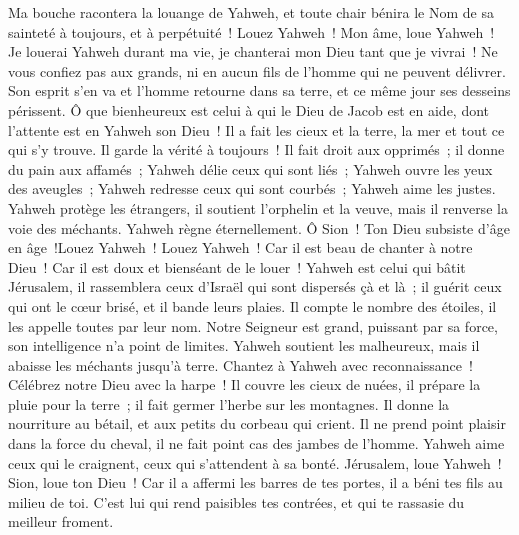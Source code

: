 \begin{multicols}{2}
 Ma bouche racontera la louange de Yahweh, et toute chair bénira le Nom de sa sainteté à toujours, et à perpétuité~!
\VerseOne{}Louez Yahweh~! Mon âme, loue Yahweh~!
Je louerai Yahweh durant ma vie, je chanterai mon Dieu tant que je vivrai~!
Ne vous confiez pas aux grands, ni en aucun fils de l'homme qui ne peuvent délivrer.
Son esprit s'en va et l'homme retourne dans sa terre, et ce même jour ses desseins périssent.
Ô que bienheureux est celui à qui le Dieu de Jacob est en aide, dont l'attente est en Yahweh son Dieu~!
Il a fait les cieux et la terre, la mer et tout ce qui s'y trouve. Il garde la vérité à toujours~!
Il fait droit aux opprimés~; il donne du pain aux affamés~; Yahweh délie ceux qui sont liés~;
Yahweh ouvre les yeux des aveugles~; Yahweh redresse ceux qui sont courbés~; Yahweh aime les justes.
Yahweh protège les étrangers, il soutient l'orphelin et la veuve, mais il renverse la voie des méchants.
Yahweh règne éternellement. Ô Sion~! Ton Dieu subsiste d'âge en âge~!Louez Yahweh~!
\VerseOne{}Louez Yahweh~! Car il est beau de chanter à notre Dieu~! Car il est doux et bienséant de le louer~!
Yahweh est celui qui bâtit Jérusalem, il rassemblera ceux d'Israël qui sont dispersés çà et là~;
il guérit ceux qui ont le cœur brisé, et il bande leurs plaies.
Il compte le nombre des étoiles, il les appelle toutes par leur nom.
Notre Seigneur est grand, puissant par sa force, son intelligence n'a point de limites.
Yahweh soutient les malheureux, mais il abaisse les méchants jusqu'à terre.
Chantez à Yahweh avec reconnaissance~! Célébrez notre Dieu avec la harpe~!
Il couvre les cieux de nuées, il prépare la pluie pour la terre~; il fait germer l'herbe sur les montagnes.
Il donne la nourriture au bétail, et aux petits du corbeau qui crient.
Il ne prend point plaisir dans la force du cheval, il ne fait point cas des jambes de l'homme.
Yahweh aime ceux qui le craignent, ceux qui s'attendent à sa bonté.
Jérusalem, loue Yahweh~! Sion, loue ton Dieu~!
Car il a affermi les barres de tes portes, il a béni tes fils au milieu de toi.
C'est lui qui rend paisibles tes contrées, et qui te rassasie du meilleur froment.

\end{multicols}
